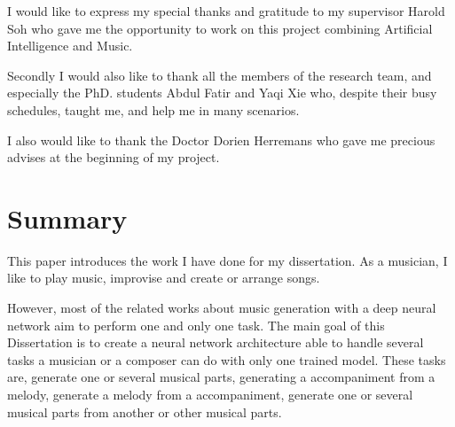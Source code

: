 \documentclass[12pt]{report}
\begin{document}
I would like to express my special thanks and gratitude to my supervisor Harold Soh who gave me the opportunity to work on this project combining Artificial Intelligence and Music.

Secondly I would also like to thank all the members of the research team, and especially the PhD. students Abdul Fatir and Yaqi Xie who, despite their busy schedules, taught me, and help me in many scenarios.

I also would like to thank the Doctor Dorien Herremans who gave me precious advises at the beginning of my project.

\newpage
\tableofcontents
\newpage


\setlength{\parindent}{0.6cm}


\chapter*{Summary}

This paper introduces the work I have done for my dissertation.
As a musician, I like to play music, improvise and create or arrange songs.

However, most of the related works about music generation with a deep neural network aim to perform one and only one task.
The main goal of this Dissertation is to create a neural network architecture able to handle several tasks a musician or a composer can do with only one trained model.
These tasks are, generate one or several musical parts, generating a accompaniment from a melody, generate a melody from a accompaniment, generate one or several musical parts from another or other musical parts.
\end{document}
